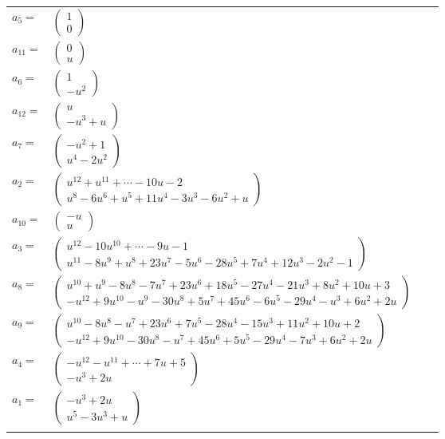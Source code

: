 \documentclass[1p]{elsarticle_modified}
\theoremstyle{definition}
\begin{document}
\begin{tabular}{m{7pt} m{180pt} m{7pt} m{180pt} }
\flushright $a_{5}=$&$\begin{pmatrix}1\\0\end{pmatrix}$ \\
\flushright $a_{11}=$&$\begin{pmatrix}0\\u\end{pmatrix}$ \\
\flushright $a_{6}=$&$\begin{pmatrix}1\\- u^2\end{pmatrix}$ \\
\flushright $a_{12}=$&$\begin{pmatrix}u\\- u^3+u\end{pmatrix}$ \\
\flushright $a_{7}=$&$\begin{pmatrix}- u^2+1\\u^4-2 u^2\end{pmatrix}$ \\
\flushright $a_{2}=$&$\begin{pmatrix}u^{12}+u^{11}+\cdots-10 u-2\\u^8-6 u^6+u^5+11 u^4-3 u^3-6 u^2+u\end{pmatrix}$ \\
\flushright $a_{10}=$&$\begin{pmatrix}- u\\u\end{pmatrix}$ \\
\flushright $a_{3}=$&$\begin{pmatrix}u^{12}-10 u^{10}+\cdots-9 u-1\\u^{11}-8 u^9+u^8+23 u^7-5 u^6-28 u^5+7 u^4+12 u^3-2 u^2-1\end{pmatrix}$ \\
\flushright $a_{8}=$&$\begin{pmatrix}u^{10}+u^9-8 u^8-7 u^7+23 u^6+18 u^5-27 u^4-21 u^3+8 u^2+10 u+3\\- u^{12}+9 u^{10}- u^9-30 u^8+5 u^7+45 u^6-6 u^5-29 u^4- u^3+6 u^2+2 u\end{pmatrix}$ \\
\flushright $a_{9}=$&$\begin{pmatrix}u^{10}-8 u^8- u^7+23 u^6+7 u^5-28 u^4-15 u^3+11 u^2+10 u+2\\- u^{12}+9 u^{10}-30 u^8- u^7+45 u^6+5 u^5-29 u^4-7 u^3+6 u^2+2 u\end{pmatrix}$ \\
\flushright $a_{4}=$&$\begin{pmatrix}- u^{12}- u^{11}+\cdots+7 u+5\\- u^3+2 u\end{pmatrix}$ \\
\flushright $a_{1}=$&$\begin{pmatrix}- u^3+2 u\\u^5-3 u^3+u\end{pmatrix}$\\&\end{tabular}
\end{document}
